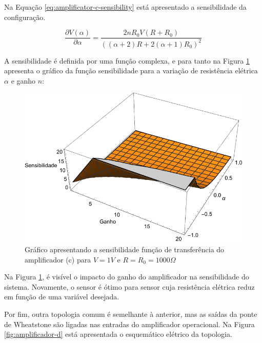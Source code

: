 \documentclass[a4paper]{instrumentacao}
\begin{document}
Na Equação \ref{eq:amplificator-c-sensibility} está apresentado a sensibilidade da configuração.

\begin{equation}
	\frac{\partial V(\alpha)}{\partial \alpha} = \frac{2 n R_0 V (R+R_0)}{((\alpha +2) R+2 (\alpha +1) R_0)^2}
	\label{eq:amplificator-c-sensibility}
\end{equation}

A sensibilidade é definida por uma função complexa, e para tanto na Figura  \ref{fig:amplificador-c-sensibilidade} apresenta o gráfico da função sensibilidade para a variação de resistência elétrica $\alpha$ e ganho $n$:

\begin{figure}[H]
\center
\includegraphics[width=\textwidth]{Amplificador-C-Sensibility.pdf}
\caption{Gráfico apresentando a sensibilidade função de transferência do amplificador (c) para $V=1V$ e $R = R_0 = 1000\Omega$}
\label{fig:amplificador-c-sensibilidade}
\end{figure}

Na Figura \ref{fig:amplificador-c-sensibilidade}, é visível o impacto do ganho do amplificador na sensibilidade do sistema. Novamente, o sensor é ótimo para sensor cuja resistência elétrica reduz em função de uma variável desejada.


Por fim, outra topologia comum é semelhante à anterior, mas as saídas da ponte de Wheatstone são ligadas nas entradas do amplificador operacional. Na Figura \ref{fig:amplificador-d} está apresentada o esquemático elétrico da topologia.
\end{document}
